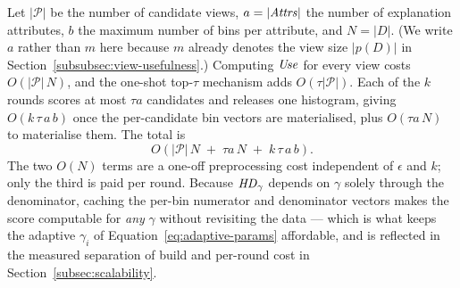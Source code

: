 Let $|\mathcal{P}|$ be the number of candidate views, $a=|\mathit{Attrs}|$ the number of explanation attributes, $b$ the maximum number of bins per attribute, and $N=|D|$.
(We write $a$ rather than $m$ here because $m$ already denotes the view size $|p(D)|$ in Section~\ref{subsubsec:view-usefulness}.)
Computing $\mathit{Use}$ for every view costs $O(|\mathcal{P}|\,N)$, and the one-shot top-$\tau$ mechanism adds $O(\tau|\mathcal{P}|)$.
Each of the $k$ rounds scores at most $\tau a$ candidates and releases one histogram, giving $O(k\,\tau\,a\,b)$ once the per-candidate bin vectors are materialised, plus $O(\tau a\, N)$ to materialise them.
The total is
\[
O\!\left(|\mathcal{P}|\,N \;+\; \tau a\, N \;+\; k\,\tau\,a\,b\right).
\]
The two $O(N)$ terms are a one-off preprocessing cost independent of $\epsilon$ and $k$; only the third is paid per round.
Because $\mathit{HD}_\gamma$ depends on $\gamma$ solely through the denominator, caching the per-bin numerator and denominator vectors makes the score computable for \emph{any} $\gamma$ without revisiting the data --- which is what keeps the adaptive $\gamma_i$ of Equation~\eqref{eq:adaptive-params} affordable, and is reflected in the measured separation of build and per-round cost in Section~\ref{subsec:scalability}.
